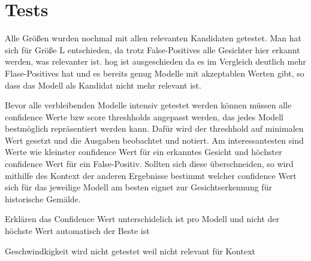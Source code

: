 \chapter{Tests}

Alle Größen wurden nochmal mit allen relevanten Kandidaten getestet. Man hat sich für Größe L entschieden, da trotz False-Positives alle Gesichter hier erkannt werden, was relevanter ist. \gls{hog} ist ausgeschieden da es im Vergleich deutlich mehr Flase-Positives hat und es bereits genug Modelle mit akzeptablen Werten gibt, so dass das Modell als Kandidat nicht mehr relevant ist.

Bevor alle verbleibenden Modelle intensiv getestet werden können müssen alle confidence Werte bzw score threshholds angepasst werden, das jedes Modell bestmöglich repräsentiert werden kann. Dafür wird der threshhold auf minimalen Wert gesetzt und die Ausgaben beobachtet und notiert. Am interessantesten sind Werte wie kleinster confidence Wert für ein erkanntes Gesicht und höchster confidence Wert für ein False-Positiv. Sollten sich diese überschneiden, so wird mithilfe des Kontext der anderen Ergebnisse bestimmt welcher confidence Wert sich für das jeweilige Modell am besten eignet zur Gesichtserkennung für historische Gemälde.

Erklären das Confidence Wert unterschidelich ist pro Modell und nicht der höchste Wert automatisch der Beste ist

Geschwindkigkeit wird nicht getestet weil nicht relevant für Kontext

